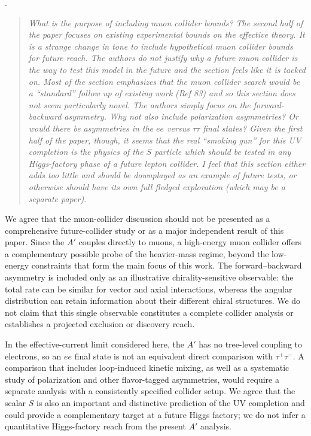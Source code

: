 \documentclass[12pt,a4paper]{article}
\begin{document}
\medskip
{}.
\begin{quote}\itshape
What is the purpose of including muon collider bounds? The second half of the paper focuses on existing experimental bounds on the effective theory. It is a strange change in tone to include hypothetical muon collider bounds for future reach. The authors do not justify why a future muon collider is the way to test this model in the future and the section feels like it is tacked on. Most of the section emphasizes that the muon collider search would be a ``standard'' follow up of existing work (Ref 83) and so this section does not seem particularly novel. The authors simply focus on the forward-backward asymmetry. Why not also include polarization asymmetries? Or would there be asymmetries in the \(ee\) versus \(\tau\tau\) final states? Given the first half of the paper, though, it seems that the real ``smoking gun'' for this UV completion is the physics of the \(S\) particle which should be tested in any Higgs-factory phase of a future lepton collider. I feel that this section either adds too little and should be downplayed as an example of future tests, or otherwise should have its own full fledged exploration (which may be a separate paper).
\end{quote}



We agree that the muon-collider discussion should not be presented as a comprehensive future-collider study or as a major independent result of this paper. Since the \(A'\) couples directly to muons, a high-energy muon collider offers a complementary possible probe of the heavier-mass regime, beyond the low-energy constraints that form the main focus of this work. The forward--backward asymmetry is included only as an illustrative chirality-sensitive observable: the total rate can be similar for vector and axial interactions, whereas the angular distribution can retain information about their different chiral structures. We do not claim that this single observable constitutes a complete collider analysis or establishes a projected exclusion or discovery reach.

In the effective-current limit considered here, the \(A'\) has no tree-level coupling to electrons, so an \(ee\) final state is not an equivalent direct comparison with \(\tau^+\tau^-\). A comparison that includes loop-induced kinetic mixing, as well as a systematic study of polarization and other flavor-tagged asymmetries, would require a separate analysis with a consistently specified collider setup. We agree that the scalar \(S\) is also an important and distinctive prediction of the UV completion and could provide a complementary target at a future Higgs factory; we do not infer a quantitative Higgs-factory reach from the present \(A'\) analysis.
\end{document}

